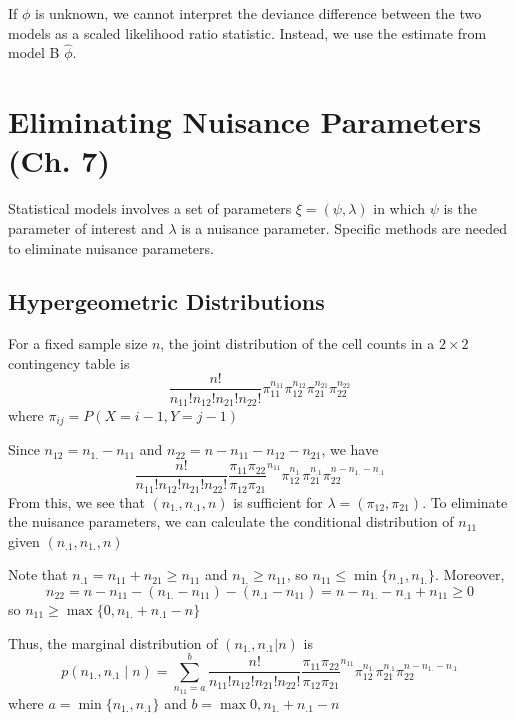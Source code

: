 \documentclass[12pt]{article}
\numberwithin{equation}{section}
\begin{document}
If $\phi$ is unknown, we cannot interpret the deviance difference between the two models as a scaled likelihood ratio statistic. Instead, we use the estimate from model B $\hat{\phi}$.

\section{Eliminating Nuisance Parameters (Ch. 7)}
Statistical models involves a set of parameters $\xi = (\psi, \lambda)$ in which $\psi$ is the parameter of interest and $\lambda$ is a nuisance parameter. Specific methods are needed to eliminate nuisance parameters.

\subsection{Hypergeometric Distributions}
For a fixed sample size $n$, the joint distribution of the cell counts in a $2 \times 2$ contingency table is
\begin{equation*}
  \frac{n!}{n_{11}! n_{12}! n_{21}! n_{22}!} \pi_{11}^{n_{11}} \pi_{12}^{n_{12}} \pi_{21}^{n_{21}} \pi_{22}^{n_{22}}
\end{equation*}
where $\pi_{ij} = P(X = i - 1, Y = j - 1)$

Since $n_{12} = n_{1.} - n_{11}$ and 
$n_{22} = n - n_{11} - n_{12} - n_{21}$, we have
%
\begin{equation*}
  \frac{n!}{n_{11}! n_{12}! n_{21}! n_{22}!}
    \frac{\pi_{11} \pi_{22}}{\pi_{12} \pi_{21}}^{n_{11}} \pi_{12}^{n_{1.}} \pi_{21}^{n_.1} \pi_{22} ^ {n - n_{1.} - n_{.1}}
\end{equation*}
%
From this, we see that $(n_{1.}, n_{.1}, n)$ is sufficient for 
$\lambda = (\pi_{12}, \pi_{21})$. To eliminate the nuisance parameters, we can calculate the conditional distribution of $n_{11}$ given $(n_{.1}, n_{1.}, n)$

Note that $n_{.1} = n_{11} + n_{21} \ge n_{11}$ and $n_{1.} \ge n_{11}$, so $n_{11} \le \min\{ n_{.1}, n_{1.} \}$. Moreover,
\begin{equation*}
  n_{22} = n - n_{11} - (n_{1.} - n_{11}) - (n_{.1} - n_{11}) = n - n_{1.} - n_{.1} + n_{11} \ge 0
\end{equation*}
so $n_{11} \ge \max\{ 0, n_{1.} + n_{.1} - n \}$

Thus, the marginal distribution of $(n_{1.}, n_{.1} | n)$ is
\begin{equation*}
  p(n_{1.}, n_{.1} \mid n) =
    \sum_{n_{11} = a}^b \frac{n!}{n_{11}! n_{12}! n_{21}! n_{22}!}
    \frac{\pi_{11} \pi_{22}}{\pi_{12} \pi_{21}}^{n_{11}}
    \pi_{12}^{n_{1.}} \pi_{21}^{n_.1} \pi_{22} ^ {n - n_{1.} - n_{.1}}
\end{equation*}
where $a = \min\{n_{1.}, n_{.1}\}$ and $b = \max{0, n_{1.} + n_{.1} - n}$
\end{document}
